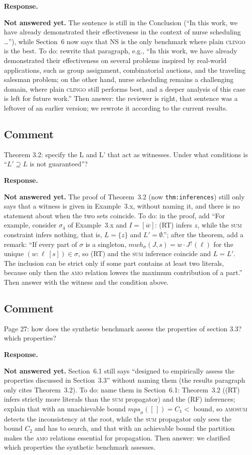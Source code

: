 \documentclass[11pt]{article}
\newcommand{\mwh}{\mathit{mwh}}
\newcommand{\mps}{\mathit{mps}}
\theoremstyle{definition}
\newcommand{\reviewertodo}{\subsection{\color{red}Comment}}
\newenvironment{response}{
    \color{blue} \textbf{Response.}
}{
}
\newcommand{\notanswered}[1]{{\color{red}\textbf{Not answered yet.} #1}}
\begin{document}
\begin{response}
\notanswered{The sentence is still in the Conclusion (``In this work, we have already demonstrated their effectiveness in the context of nurse scheduling \ldots''), while Section~6 now says that NS is the only benchmark where plain \textsc{clingo} is the best.
To do: rewrite that paragraph, e.g., ``In this work, we have already demonstrated their effectiveness on several problems inspired by real-world applications, such as group assignment, combinatorial auctions, and the traveling salesman problem; on the other hand, nurse scheduling remains a challenging domain, where plain \textsc{clingo} still performs best, and a deeper analysis of this case is left for future work.''
Then answer: the reviewer is right, that sentence was a leftover of an earlier version; we rewrote it according to the current results.}
\end{response}

\vspace{0.5cm}
\reviewertodo
Theorem 3.2: specify the L and L' that act as witnesses. Under what conditions is ``$L' \supseteq L$ is not guaranteed''?

\begin{response}
\notanswered{The proof of Theorem~3.2 (now \texttt{thm:inferences}) still only says that a witness is given in Example~3.x, without naming it, and there is no statement about when the two sets coincide.
To do: in the proof, add ``For example, consider $\sigma_4$ of Example~3.x and $I = [\overline{w}]$: (RT) infers $z$, while the \textsc{sum} constraint infers nothing, that is, $L = \{z\}$ and $L' = \emptyset$.''; after the theorem, add a remark: ``If every part of $\sigma$ is a singleton, $\mwh_\sigma(J,s) = w \cdot J^\uparrow(\ell)$ for the unique $(w : \ell\ [s]) \in \sigma$, so (RT) and the \textsc{sum} inference coincide and $L = L'$. The inclusion can be strict only if some part contains at least two literals, because only then the \textsc{amo} relation lowers the maximum contribution of a part.''
Then answer with the witness and the condition above.}
\end{response}

\vspace{0.5cm}
\reviewertodo
Page 27: how does the synthetic benchmark assess the properties of section 3.3? which properties?

\begin{response}
\notanswered{Section~6.1 still says ``designed to empirically assess the properties discussed in Section~3.3'' without naming them (the results paragraph only cites Theorem~3.2).
To do: name them in Section~6.1: Theorem~3.2 ((RT) infers strictly more literals than the \textsc{sum} propagator) and the (RF) inferences; explain that with an unachievable bound $\mps_\sigma([\,]) = C_1 <$ bound, so \textsc{amosum} detects the inconsistency at the root, while the \textsc{sum} propagator only sees the bound $C_2$ and has to search, and that with an achievable bound the partition makes the \textsc{amo} relations essential for propagation.
Then answer: we clarified which properties the synthetic benchmark assesses.}
\end{response}
\end{document}
